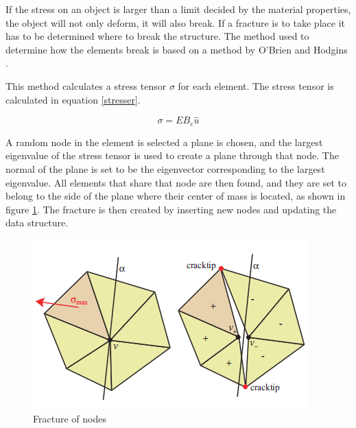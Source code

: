 If the stress on an object is larger than a limit decided by the material properties, the object will not only deform, it will also break. If a fracture is to take place it has to be determined where to break the structure. The method used to determine how the elements break is based on a method by O'Brien and Hodgins \cite{fracture} .

This method calculates a stress tensor $\sigma$ for each element. The stress tensor is calculated in equation \ref{stresser}.
 
 \begin{equation}\label{stresser}
 \sigma = EB_{e}\hat{u}
 \end{equation}
 
 A random node in the element is selected a plane is chosen, and the largest eigenvalue of the stress tensor is used to create a plane through that node. The normal of the plane is set to be the eigenvector corresponding to the largest eigenvalue. All elements that share that node are then found, and they are set to belong to the side of the plane where their center of mass is located, as shown in figure \ref{fig:fracture}. The fracture is then created by inserting new nodes and updating the data structure.

\begin{figure}[htbp]
\label{fig:fracture}
\begin{center}
\includegraphics[scale = 0.6]{figures/fracture.png}
\caption{Fracture of nodes}
\end{center}
\end{figure} 